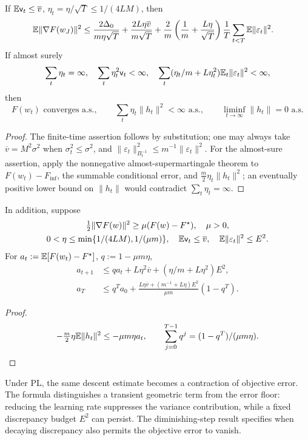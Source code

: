 \begin{corollary}
If $\mathbb E\mathsf v_t\le\overline v$, $\eta_t=\eta/\sqrt T\le1/(4LM)$, then
\begin{align}
 \mathbb E\|\nabla F(w_J)\|^2
 &\le\frac{2\Delta_0}{m\eta\sqrt T}
       +\frac{2L\eta\overline v}{m\sqrt T}
       +\frac{2}{m}\left(\frac1m+\frac{L\eta}{\sqrt T}\right)
                        \frac1T\sum_{t<T}\mathbb E\|\varepsilon_t\|^2.
\end{align}
If almost surely
\begin{gather}
 \sum_t\eta_t=\infty,\quad
 \sum_t\eta_t^2\mathsf v_t<\infty,\quad
 \sum_t(\eta_t/m+L\eta_t^2)\mathbb E_t\|\varepsilon_t\|^2<\infty,
\end{gather}
then
\begin{equation}
 F(w_t)\text{ converges a.s.},\qquad
 \sum_t\eta_t\|h_t\|^2<\infty\text{ a.s.},\qquad
 \liminf_{t\to\infty}\|h_t\|=0\text{ a.s.}
\end{equation}
\end{corollary}
\begin{proof}
The finite-time assertion follows by substitution; one may always take
$\overline v=M^2\sigma^2$ when $\sigma_t^2\le\sigma^2$, and
$\|\varepsilon_t\|_{B_t^{-1}}^2\le m^{-1}\|\varepsilon_t\|^2$.
For the almost-sure assertion,
apply the nonnegative almost-supermartingale theorem \citep{robbins1971convergence}
to $F(w_t)-F_{\inf}$, the summable conditional error, and
$\tfrac m2\eta_t\|h_t\|^2$; an eventually positive lower bound on $\|h_t\|$
would contradict $\sum_t\eta_t=\infty$.
\end{proof}
\begin{theorem}\label{thm:tf-PL}
In addition, suppose
\begin{gather}
 \tfrac12\|\nabla F(w)\|^2\ge\mu(F(w)-F^\star),\quad\mu>0,\\
 0<\eta\le\min\{1/(4LM),1/(\mu m)\},\quad
 \mathbb E\mathsf v_t\le\overline v,\quad\mathbb E\|\varepsilon_t\|^2\le E^2.
\end{gather}
For $a_t:=\mathbb E[F(w_t)-F^\star]$, $q:=1-\mu m\eta$,
\begin{align}
 a_{t+1}&\le qa_t+L\eta^2\overline v+(\eta/m+L\eta^2)E^2,\\
 a_T&\le q^Ta_0+
 \frac{L\eta\overline v+(m^{-1}+L\eta)E^2}{\mu m}(1-q^T).
\end{align}
\end{theorem}
\begin{proof}
\begin{gather}
 -\tfrac m2\eta\mathbb E\|h_t\|^2\le-\mu m\eta a_t,\qquad
 \sum_{j=0}^{T-1}q^j=(1-q^T)/(\mu m\eta).
\end{gather}
\end{proof}
Under PL, the same descent estimate becomes a contraction of objective error.
The formula distinguishes a transient geometric term from the error floor:
reducing the learning rate suppresses the variance contribution, while a fixed
discrepancy budget $E^2$ can persist. The diminishing-step result specifies when
decaying discrepancy also permits the objective error to vanish.


